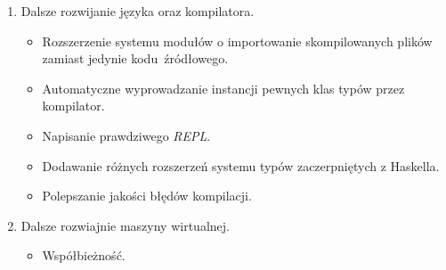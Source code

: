\documentclass[12pt, a4paper, oneside]{report}
\begin{document}
\begin{enumerate}
    \item Dalsze rozwijanie języka oraz kompilatora.
    \begin{itemize}
        \item Rozszerzenie systemu modułów o importowanie skompilowanych
              plików zamiast jedynie kodu źródłowego.
        \item Automatyczne wyprowadzanie instancji pewnych klas typów przez
              kompilator.
        \item Napisanie prawdziwego \textit{REPL}.
        \item Dodawanie różnych rozszerzeń systemu typów zaczerpniętych z 
              Haskella.
        \item Polepszanie jakości błędów kompilacji.
    \end{itemize}

    \item Dalsze rozwiajnie maszyny wirtualnej.
    \begin{itemize}
        \item Współbieżność.
    \end{itemize}

\end{enumerate}
\end{document}

